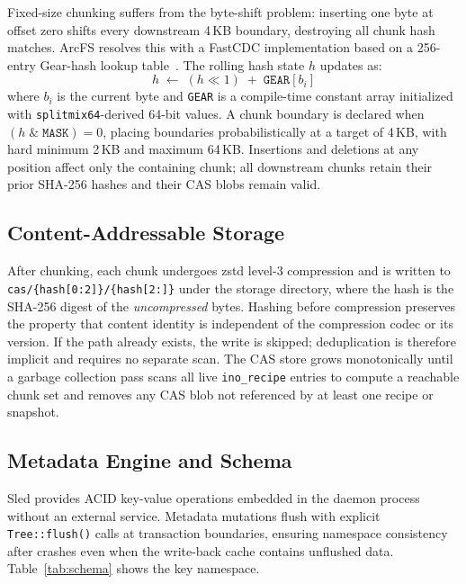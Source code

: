 \documentclass[conference]{IEEEtran}
\begin{document}
Fixed-size chunking suffers from the byte-shift problem: inserting one byte
at offset zero shifts every downstream 4\,KB boundary, destroying all chunk
hash matches. ArcFS resolves this with a FastCDC implementation based on a
256-entry Gear-hash lookup table~\cite{xia2016fastcdc}. The rolling hash
state $h$ updates as:
\begin{equation}
  h \;\leftarrow\; (h \ll 1) \;+\; \texttt{GEAR}[b_i]
  \label{eq:gear}
\end{equation}
where $b_i$ is the current byte and \texttt{GEAR} is a compile-time
constant array initialized with \texttt{splitmix64}-derived 64-bit values.
A chunk boundary is declared when $(h \;\&\; \texttt{MASK}) = 0$, placing
boundaries probabilistically at a target of 4\,KB, with hard minimum
2\,KB and maximum 64\,KB. Insertions and deletions at any position affect
only the containing chunk; all downstream chunks retain their prior SHA-256
hashes and their CAS blobs remain valid.

\subsection{Content-Addressable Storage}

After chunking, each chunk undergoes zstd level-3 compression and is
written to \texttt{cas/\{hash[0:2]\}/\{hash[2:]\}} under the storage
directory, where the hash is the SHA-256 digest of the \emph{uncompressed}
bytes. Hashing before compression preserves the property that content
identity is independent of the compression codec or its version. If the
path already exists, the write is skipped; deduplication is therefore
implicit and requires no separate scan. The CAS store grows monotonically
until a garbage collection pass scans all live \texttt{ino\_recipe} entries
to compute a reachable chunk set and removes any CAS blob not referenced
by at least one recipe or snapshot.

\subsection{Metadata Engine and Schema}

Sled provides ACID key-value operations embedded in the daemon process
without an external service. Metadata mutations flush with explicit
\texttt{Tree::flush()} calls at transaction boundaries, ensuring namespace
consistency after crashes even when the write-back cache contains unflushed
data. Table~\ref{tab:schema} shows the key namespace.
\end{document}
